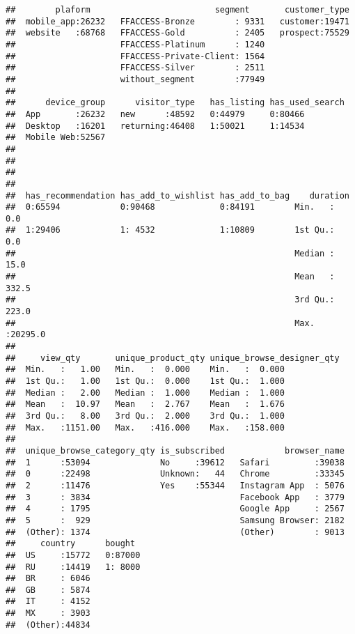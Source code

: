 \documentclass[
]{book}
\begin{document}
\begin{verbatim}
##        plaform                         segment       customer_type  
##  mobile_app:26232   FFACCESS-Bronze        : 9331   customer:19471  
##  website   :68768   FFACCESS-Gold          : 2405   prospect:75529  
##                     FFACCESS-Platinum      : 1240                   
##                     FFACCESS-Private-Client: 1564                   
##                     FFACCESS-Silver        : 2511                   
##                     without_segment        :77949                   
##                                                                     
##      device_group      visitor_type   has_listing has_used_search
##  App       :26232   new      :48592   0:44979     0:80466        
##  Desktop   :16201   returning:46408   1:50021     1:14534        
##  Mobile Web:52567                                                
##                                                                  
##                                                                  
##                                                                  
##                                                                  
##  has_recommendation has_add_to_wishlist has_add_to_bag    duration      
##  0:65594            0:90468             0:84191        Min.   :    0.0  
##  1:29406            1: 4532             1:10809        1st Qu.:    0.0  
##                                                        Median :   15.0  
##                                                        Mean   :  332.5  
##                                                        3rd Qu.:  223.0  
##                                                        Max.   :20295.0  
##                                                                         
##     view_qty       unique_product_qty unique_browse_designer_qty
##  Min.   :   1.00   Min.   :  0.000    Min.   :  0.000           
##  1st Qu.:   1.00   1st Qu.:  0.000    1st Qu.:  1.000           
##  Median :   2.00   Median :  1.000    Median :  1.000           
##  Mean   :  10.97   Mean   :  2.767    Mean   :  1.676           
##  3rd Qu.:   8.00   3rd Qu.:  2.000    3rd Qu.:  1.000           
##  Max.   :1151.00   Max.   :416.000    Max.   :158.000           
##                                                                 
##  unique_browse_category_qty is_subscribed            browser_name  
##  1      :53094              No     :39612   Safari         :39038  
##  0      :22498              Unknown:   44   Chrome         :33345  
##  2      :11476              Yes    :55344   Instagram App  : 5076  
##  3      : 3834                              Facebook App   : 3779  
##  4      : 1795                              Google App     : 2567  
##  5      :  929                              Samsung Browser: 2182  
##  (Other): 1374                              (Other)        : 9013  
##     country      bought   
##  US     :15772   0:87000  
##  RU     :14419   1: 8000  
##  BR     : 6046            
##  GB     : 5874            
##  IT     : 4152            
##  MX     : 3903            
##  (Other):44834
\end{verbatim}
\end{document}
